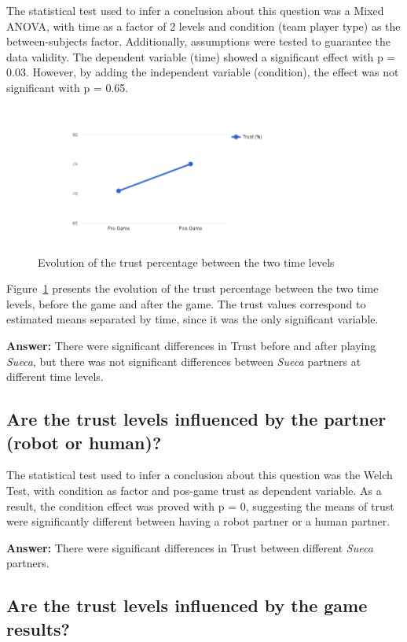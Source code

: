 The statistical test used to infer a conclusion about this question was a Mixed ANOVA, with time as a factor of 2 levels and condition (team player type) as the between-subjects factor.
Additionally, assumptions were tested to guarantee the data validity.
The dependent variable (time) showed a significant effect with p = 0.03.
However, by adding the independent variable (condition), the effect was not significant with p = 0.65.

\begin{figure}[h!]
  \centering
    \includegraphics[width=0.7\textwidth]{./img/6/trustMixedANOVA}
  \caption{Evolution of the trust percentage between the two time levels}
\label{fig:trustMixedANOVA}
\end{figure}

Figure~\ref{fig:trustMixedANOVA} presents the evolution of the trust percentage between the two time levels, before the game and after the game.
The trust values correspond to estimated means separated by time, since it was the only significant variable.

\textbf{Answer:} There were significant differences in Trust before and after playing \emph{Sueca}, but there was not significant differences between \emph{Sueca} partners at different time levels.



\subsection*{Are the trust levels influenced by the partner (robot or human)?}

The statistical test used to infer a conclusion about this question was the Welch Test, with condition as factor and pos-game trust as dependent variable.
As a result, the condition effect was proved with p = 0, suggesting the means of trust were significantly different between having a robot partner or a human partner.

\textbf{Answer:} There were significant differences in Trust between different \emph{Sueca} partners.


\subsection*{Are the trust levels influenced by the game results?}



\clearpage
